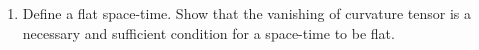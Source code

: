 \documentclass[../main-sheet.tex]{subfiles}
\begin{document}
\begin{enumerate}
\begin{enumerate}
        \item Define a flat space-time. Show that the vanishing of curvature tensor is a necessary and sufficient condition for a space-time to be flat.



\end{enumerate}
\end{enumerate}
\end{document}
